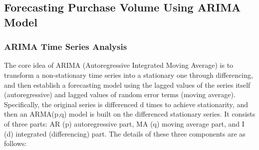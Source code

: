 \documentclass{article}
\begin{document}
		\subsection{Forecasting Purchase Volume Using ARIMA Model}
	
	\subsubsection{ ARIMA Time Series Analysis}
	
	The core idea of ARIMA (Autoregressive Integrated Moving Average) is to transform a non-stationary time series into a stationary one through differencing, and then establish a forecasting model using the lagged values of the series itself (autoregressive) and lagged values of random error terms (moving average). Specifically, the original series is differenced d times to achieve stationarity, and then an ARMA(p,q) model is built on the differenced stationary series. It consists of three parts: AR (p) autoregressive part, MA (q) moving average part, and I (d) integrated (differencing) part. The details of these three components are as follows:
	
\end{document}
